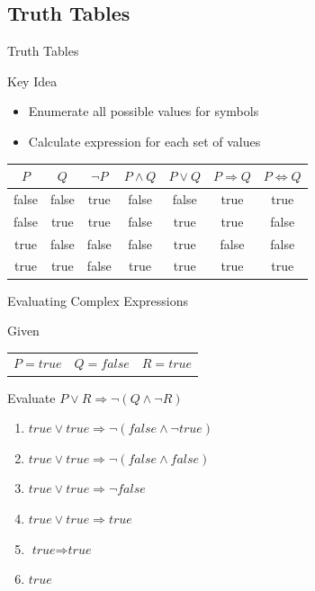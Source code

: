 \documentclass[14pt]{beamer}
\newcommand{\limpl}{\Rightarrow}
\newcommand{\liff}{\Leftrightarrow}
\begin{document}
\subsection{Truth Tables}
\begin{frame}{Truth Tables}
	\begin{block}{Key Idea}
		\begin{itemize}
			\item Enumerate all possible values for symbols
			\item Calculate expression for each set of values
		\end{itemize}
	\end{block}
	\bigskip
	\em
	\begin{tabular}{|c|c||c|c|c|c|c|}
	\hline
	$P$   & $Q$   & $\lnot P$ & $P \land Q$ & $P \lor Q$ & $P \limpl Q$ & $P \liff Q$ \\
	\hline
	false & false & true      & false       & false      & true         & true \\
	false & true  & true      & false       & true       & true         & false \\
	true  & false & false     & false       & true       & false        & false \\
	true  & true  & false     & true        & true       & true         & true \\
	\hline
	\end{tabular}
\end{frame}
\begin{frame}{Evaluating Complex Expressions}
	\begin{block}{Given}
		\begin{tabular}{lll}
			$P=\textit{true}$ & $Q=\textit{false}$ & $R=\textit{true}$ 
		\end{tabular}
	\end{block}
	\begin{block}{Evaluate}
		$P \lor R \limpl \lnot (Q \land \lnot R)$
	\end{block}
	\begin{enumerate}
		\pause\item $\textit{true} \lor \textit{true} \limpl \lnot (\textit{false} \land \lnot \textit{true})$
		\pause\item $\textit{true} \lor \textit{true} \limpl \lnot (\textit{false} \land \textit{false})$
		\pause\item $\textit{true} \lor \textit{true} \limpl \lnot \textit{false}$
		\pause\item $\textit{true} \lor \textit{true} \limpl \textit{true}$
		\pause\item $\textit{true} \limpl \textit{true}$
		\pause\item $\textit{true}$
	\end{enumerate}
\end{frame}
\end{document}
